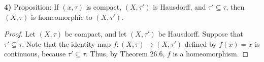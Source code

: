 \documentclass[12pt]{report}
\begin{document}
\newpage\noindent\textbf{4)} Proposition: If $(x, \tau)$ is compact, $(X, \tau')$ is Hausdorff, and $\tau' \subseteq \tau$, then $(X, \tau)$ is homeomorphic to $(X, \tau')$.
\begin{proof}
    Let $(X, \tau)$ be compact, and let $(X, \tau')$ be Hausdorff.
    Suppose that $\tau' \subseteq \tau$.
    Note that the identity map $f: (X, \tau) \to (X, \tau')$ defined by $f(x) = x$ is continuous, because $\tau' \subseteq \tau$.
    Thus, by Theorem 26.6, $f$ is a homeomorphism.
\end{proof}
\end{document}
